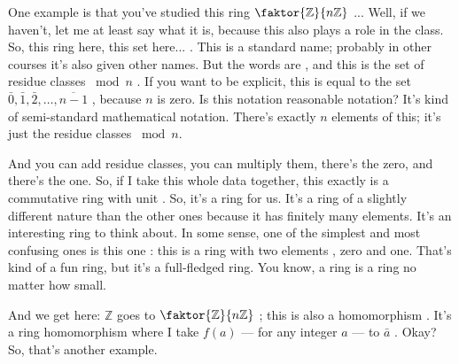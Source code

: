 \begin{speech}[00:28:24 - 00:30:48]
One example is that you've studied this ring $\faktor{\mathbb{Z}}{n\mathbb{Z}}$ ... Well, if we haven't, let me at least say what it is, because this also plays a role in the class. So, this ring here, this set here... . This is a standard name; probably in other courses it's also given other names. But the words are , and this is the set of residue classes $\bmod n$ . If you want to be explicit, this is equal to the set $\bar{0}, \bar{1}, \bar{2}, \dots, \overline{n-1}$ , because $n$ is zero. Is this notation reasonable notation? It's kind of semi-standard mathematical notation. There's exactly $n$ elements of this; it's just the residue classes $\bmod n$.

And you can add residue classes, you can multiply them, there's the zero, and there's the one. So, if I take this whole data together, this exactly is a commutative ring with unit . So, it's a ring for us. It's a ring of a slightly different nature than the other ones because it has finitely many elements. It's an interesting ring to think about. In some sense, one of the simplest and most confusing ones is this one : this is a ring with two elements , zero and one. That's kind of a fun ring, but it's a full-fledged ring. You know, a ring is a ring no matter how small.

And we get here: $\mathbb{Z}$ goes to $\faktor{\mathbb{Z}}{n\mathbb{Z}}$ ; this is also a homomorphism . It's a ring homomorphism where I take $f(a)$ --- for any integer $a$ --- to $\bar{a}$ . Okay? So, that's another example.
\end{speech}

